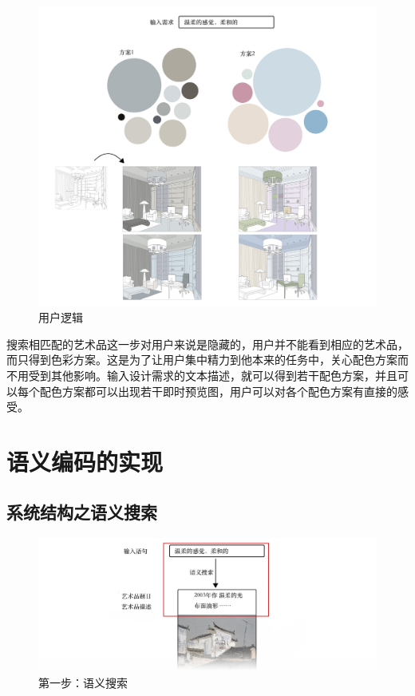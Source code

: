 \begin{figure}[!htbp]
\centering
\includegraphics[width=\linewidth,keepaspectratio]{data/chapter-1/用户逻辑.jpg}
\caption{用户逻辑}
\label{figure:用户逻辑}
\end{figure}

搜索相匹配的艺术品这一步对用户来说是隐藏的，用户并不能看到相应的艺术品，而只得到色彩方案。这是为了让用户集中精力到他本来的任务中，关心配色方案而不用受到其他影响。输入设计需求的文本描述，就可以得到若干配色方案，并且可以每个配色方案都可以出现若干即时预览图，用户可以对各个配色方案有直接的感受。


\section{语义编码的实现}

\subsection{系统结构之语义搜索}

\begin{figure}[!htbp]
\centering
\includegraphics[width=\linewidth,keepaspectratio]{data/chapter-1/系统内部逻辑1步.jpg}
\caption{第一步：语义搜索}
\label{figure:语义搜索}
\end{figure}

